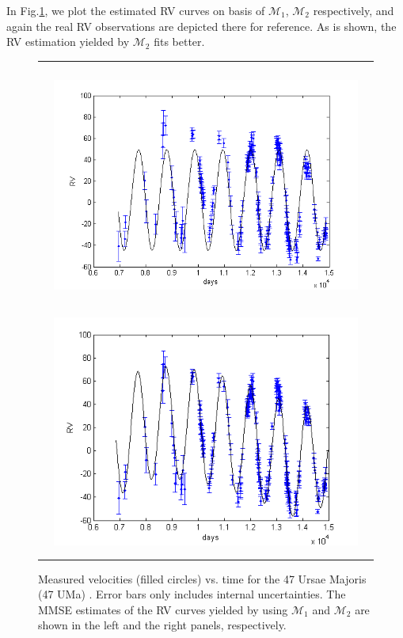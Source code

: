 \documentclass[aoas]{imsart}
\begin{document}
In Fig.\ref{fig:uma47_fit}, we plot the estimated RV curves on basis
of $\mathcal{M}_1$, $\mathcal{M}_2$ respectively, and again the real
RV observations are depicted there for reference. As is shown, the
RV estimation yielded by $\mathcal{M}_2$ fits better.

\begin{figure}[!htb]
\begin{tabular}{c}
\centerline{\includegraphics[width=4in,height=3.2in]{Fig/uma47_1p_fit.png}\includegraphics[width=4in,height=3.2in]{Fig/uma47_2p_fit.png}}
\end{tabular}
\caption{Measured velocities (filled circles) vs. time for the 47
Ursae Majoris (47 UMa) \citep{gregory2010bayesian}. Error bars only
includes internal uncertainties. The MMSE estimates of the RV curves
yielded by using $\mathcal{M}_1$ and $\mathcal{M}_2$ are shown in
the left and the right panels, respectively.} \label{fig:uma47_fit}
\end{figure}
\end{document}
